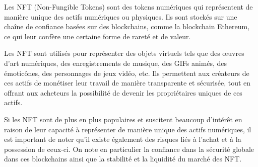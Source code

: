 Les NFT (Non-Fungible Tokens) sont des tokens numériques qui représentent de manière unique des actifs numériques ou physiques. Ils sont stockés sur une chaîne de confiance basées sur des blockchains, comme la blockchain Ethereum, ce qui leur confère une certaine forme de rareté et de valeur.

Les NFT sont utilisés pour représenter des objets virtuels tels que des œuvres d'art numériques, des enregistrements de musique, des GIFs animés, des émoticônes, des personnages de jeux vidéo, etc. Ils permettent aux créateurs de ces actifs de monétiser leur travail de manière transparente et sécurisée, tout en offrant aux acheteurs la possibilité de devenir les propriétaires uniques de ces actifs.

Si les NFT sont de plus en plus populaires et suscitent beaucoup d'intérêt en raison de leur capacité à représenter de manière unique des actifs numériques, il est important de noter qu'il existe également des risques liés à l'achat et à la possession de ceux-ci. On note en particulier la confiance dans la sécurité globale dans ces blockchains ainsi que la stabilité et la liquidité du marché des NFT.